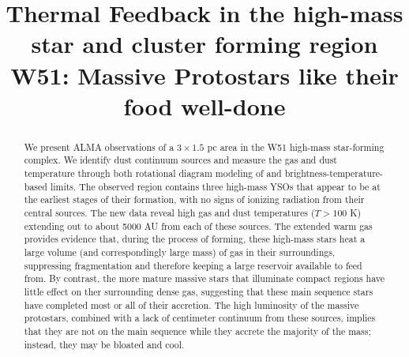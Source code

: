 \documentclass{emulateapj}
\begin{document}
\title{Thermal Feedback in the high-mass star and cluster forming region W51:
       Massive Protostars like their food well-done}


\begin{abstract}
    We present ALMA observations of a $3\times1.5$ pc area in the W51
    high-mass star-forming complex.  We identify dust continuum sources and
    measure the gas and dust temperature through both rotational diagram
    modeling of \methanol and brightness-temperature-based limits.  The
    observed region contains three high-mass YSOs that appear to be at the
    earliest stages of their formation, with no signs of ionizing radiation
    from their central sources.  The new data reveal  high gas and dust
    temperatures ($T > 100$ K) extending out to about 5000 AU from each of
    these sources.
    The extended warm gas provides evidence that, during the process of
    forming, these high-mass stars heat a large volume (and correspondingly
    large mass) of gas in their surroundings, suppressing fragmentation and
    therefore keeping a large reservoir available to feed from.  By contrast,
    the more mature massive stars that illuminate compact \hii regions have
    little effect on ther surrounding dense gas, suggesting that these main
    sequence stars have completed most or all of their accretion.  
    The high luminosity of the massive protostars, combined with a lack of
    centimeter continuum from these sources, implies that they are not on
    the main sequence while they accrete the majority of the mass; instead,
    they may be bloated and cool.
    


\end{abstract}
\end{document}
